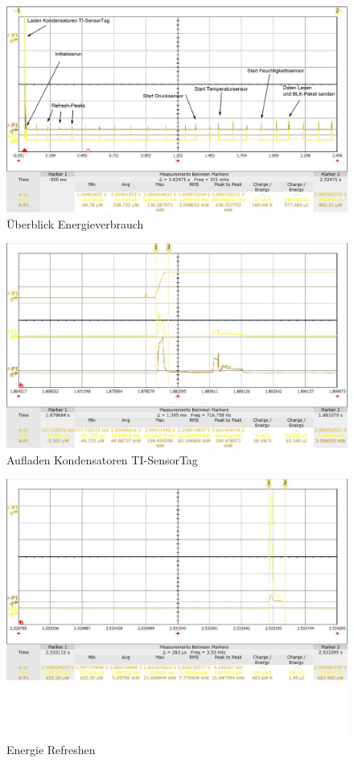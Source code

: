 \begin{figure}[ht]
  \includegraphics[width=1.0\textwidth]{3Vorgehen/imag/Ueberblick.png}
  \caption{Überblick Energieverbrauch}
  \label{energie_ueberblick}
\end{figure}

\begin{figure}[ht] 
  \includegraphics[width=1.0\textwidth] {3Vorgehen/imag/Energie_Laden_Kondensatoren_Sensortag.png}
  \caption{Aufladen Kondensatoren TI-SensorTag}
  \label{energie_kondensatoren_sensortag}
\end{figure} 
 
\begin{figure}[ht]
  \includegraphics[width=1.0\textwidth]{3Vorgehen/imag/Refresh.png}
  \caption{Energie Refreshen}
  \label{energie_refresh}
\end{figure}

